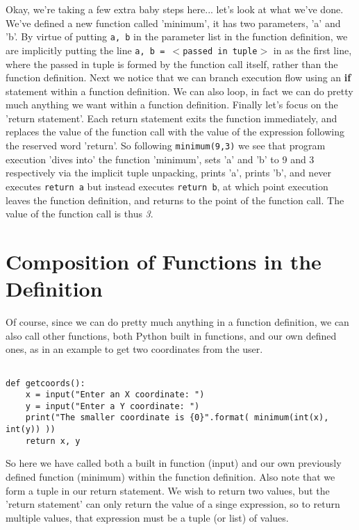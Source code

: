 Okay, we're taking a few extra baby steps here... let's look at what   we've done. We've defined a new function called 'minimum', it has two   parameters, 'a' and 'b'. By virtue of putting 
\texttt{a, b} in the   parameter list in the function definition, we are implicitly putting   the line 
\texttt{a, b = $<$passed in tuple$>$} in as the first   line, where the passed in tuple is formed by the function call itself,   rather than the function definition. Next we notice that we can branch   execution flow using an \textbf{if} statement within a function definition. We   can also loop, in fact we can do pretty much anything we want within a   function definition. Finally let's focus on the 'return statement'.   Each return statement exits the function immediately, and replaces the   value of the function call with the value of the expression following   the reserved word 'return'. So following 
\texttt{minimum(9,3)} we   see that program execution 'dives into' the function 'minimum', sets   'a' and 'b' to 9 and 3 respectively via the implicit tuple unpacking,   prints 'a', prints 'b', and never executes 
\texttt{return a} but   instead executes 
\texttt{return b}, at which point execution leaves   the function definition, and returns to the   point of the function call. The value of the function call is thus   \textit{3}.

\section{Composition of Functions in the Definition}

Of course, since we can do pretty much anything in a function   definition, we can also call other functions, both Python built in   functions, and our own defined ones, as in an example to get two   coordinates from the user.
\begin{lstlisting}

def getcoords():
    x = input("Enter an X coordinate: ")
    y = input("Enter a Y coordinate: ")
    print("The smaller coordinate is {0}".format( minimum(int(x), int(y)) ))
    return x, y
\end{lstlisting}

So here we have called both a built in function (input) and our   own previously defined function (minimum) within the function   definition. Also note that we form a tuple in our return statement. We   wish to return two values, but the 'return statement' can only return   the value of a singe expression, so to return multiple values, that   expression must be a tuple (or list) of values.

